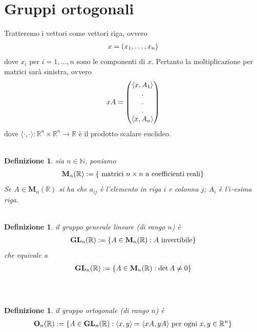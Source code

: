 \documentclass[oneside, 11pt]{amsbook}
\newcommand{\0}{{(0)}}
\newcommand{\3}{{(3)}}
\theoremstyle{colonplain}
\theoremstyle{colondefinition}
\newtheorem{defn}[thm]{Definizione}
\theoremstyle{colonremark}
\numberwithin{equation}{chapter}
\begin{document}
\section{Gruppi ortogonali}
Tratteremo i vettori come vettori riga, ovvero
\begin{align}
    x = (x_1, \dots, x_n) \notag
\end{align}
dove $x_i$ per $i = 1, \dots, n$ sono le componenti di $x$. Pertanto la moltiplicazione per matrici sarà sinistra, ovvero
\begin{align}
    xA = \begin{pmatrix}
        \langle x, A_1 \rangle \\
        . \\
        . \\
        . \\
        \langle x, A_n \rangle
    \end{pmatrix} \notag
\end{align}
dove $\langle \cdot, \cdot \rangle : \mathbb{R}^n \times \mathbb{R}^n \longrightarrow \mathbb{R}$ è il prodotto scalare euclideo. \\ \\
\begin{defn} sia $n \in \mathbb{N}$, poniamo
\begin{align}
    \mathbf{M}_n(\mathbb{R}) := \{ \text{ matrici $n \times n$ a coefficienti reali} \} \notag
\end{align}
Se $A \in \mathbf{M}_n(\mathbb{R})$ si ha che $a_{ij}$ è l'elemento in riga $i$ e colonna $j$; $A_i$ è l'$i$-esima riga. \\ \\
\end{defn}
\begin{defn} il \textit{gruppo generale lineare} (di rango $n$) è
\begin{align}
    \mathbf{GL}_n(\mathbb{R}) := \{ A \in \mathbf{M}_n(\mathbb{R}) : A \text{ invertibile} \} \notag
\end{align}
che equivale a
\begin{align}
    \mathbf{GL}_n(\mathbb{R}) := \{ A \in \mathbf{M}_n(\mathbb{R}) : \det A \neq 0 \} \notag
\end{align} \\ \\
\end{defn}
\begin{defn} il \textit{gruppo ortogonale} (di rango $n$) è
\begin{align}
    \mathbf{O}_n(\mathbb{R}) := \{ A \in \mathbf{GL}_n(\mathbb{R}) : \langle x, y \rangle = \langle xA, yA \rangle \text{ per ogni } x, y \in \mathbb{R}^n \} \notag
\end{align} \\ \\
\end{defn}
\end{document}
